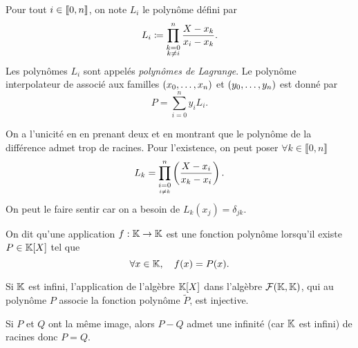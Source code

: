 \documentclass{magnolia}
\begin{document}
\begin{remarqueUnique}
\remarque  Pour tout $i\in\left\llbracket 0,n\right\rrbracket$, on note
$L_i$ le polynôme défini par
\[L_i\coloneqq \prod_{\substack{k=0\\k\neq i}}^{n} \frac{X-x_k}{x_i-x_k}.\]
Les polynômes $L_i$ sont appelés \emph{polynômes de Lagrange}.
Le polynôme interpolateur de  associé aux familles $\left(x_0,\ldots,x_{n}\right)$ et $\left(y_0,\ldots,y_{n}\right)$ est donné par
\[P=\sum_{i=0}^{n} y_i L_i.\]
\end{remarqueUnique}


\begin{preuve}
On a l'unicité en en prenant deux et en montrant que le polynôme de la différence admet trop de racines. 
  Pour l'existence, on peut poser $\forall k \in \llbracket 0,n \rrbracket$ $$L_k=\prod_{\underset{i\neq k}{i=0}}^n\left(\frac{X-x_i}{x_k-x_i}\right).$$
  On peut le faire sentir car on a besoin de $L_k(x_j)=\delta_{jk}$.
  \end{preuve}



\begin{definition}
On dit qu'une application $f:\mathbb{K}\to\mathbb{K}$ est une fonction polynôme lorsqu'il existe
$P\in\polyK$ tel que
\[\forall x\in\mathbb{K} ,\quad f(x)=P(x).\]
\end{definition}

\begin{proposition}
Si $\mathbb{K}$ est infini,
l'application de l'algèbre $\polyK$ dans l'algèbre $\mathcal{F}(\mathbb{K},\mathbb{K})$, qui au polynôme $P$ associe la fonction polynôme
$\tilde{P}$, est injective.  
\end{proposition}

\begin{preuve}
Si $P$ et $Q$ ont la même image, alors $P-Q$ admet une infinité (car $\mathbb{K}$ est infini) de racines donc $P=Q$.
\end{preuve} 
\end{document}
